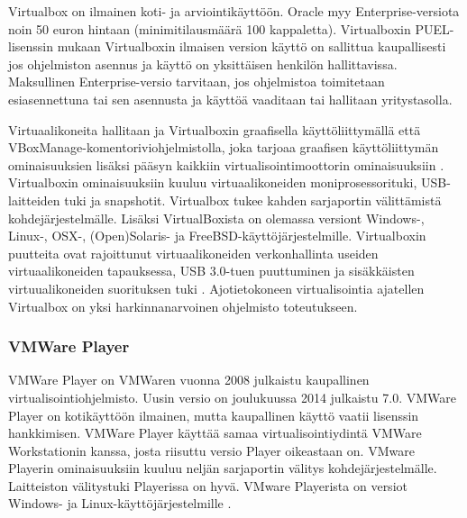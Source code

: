 
Virtualbox on ilmainen koti- ja arviointikäyttöön. Oracle myy Enterprise-versiota noin 50 euron hintaan (minimitilausmäärä 100 kappaletta).
Virtualboxin PUEL-lisenssin mukaan Virtualboxin ilmaisen version käyttö on sallittua kaupallisesti jos ohjelmiston asennus ja käyttö on yksittäisen henkilön hallittavissa. Maksullinen Enterprise-versio tarvitaan, jos ohjelmistoa toimitetaan esiasennettuna tai sen asennusta ja käyttöä vaaditaan tai hallitaan yritystasolla.\cite{virtualbox_puel,virtualbox_licensing}

Virtuaalikoneita hallitaan ja Virtualboxin graafisella käyttöliittymällä että VBoxManage-komentoriviohjelmistolla, joka tarjoaa graafisen käyttöliittymän ominaisuuksien lisäksi pääsyn kaikkiin virtualisointimoottorin ominaisuuksiin \cite{virtualbox_manual}. Virtualboxin ominaisuuksiin kuuluu virtuaalikoneiden moniprosessorituki, USB-laitteiden tuki ja snapshotit. Virtualbox tukee kahden sarjaportin välittämistä kohdejärjestelmälle. Lisäksi VirtualBoxista on olemassa versiont Windows-, Linux-, OSX-, (Open)Solaris- ja FreeBSD-käyttöjärjestelmille. Virtualboxin puutteita ovat rajoittunut virtuaalikoneiden verkonhallinta useiden virtuaalikoneiden tapauksessa, USB 3.0-tuen puuttuminen ja sisäkkäisten virtuualikoneiden suorituksen tuki \cite{vplayervsvbox}. Ajotietokoneen virtualisointia ajatellen Virtualbox on yksi harkinnanarvoinen ohjelmisto toteutukseen.


\subsubsection{VMWare Player}
VMWare Player on VMWaren vuonna 2008 julkaistu kaupallinen virtualisointiohjelmisto. Uusin versio on joulukuussa 2014 julkaistu 7.0. VMWare Player on kotikäyttöön ilmainen, mutta kaupallinen käyttö vaatii lisenssin hankkimisen. VMWare Player käyttää samaa virtualisointiydintä VMWare Workstationin kanssa, josta riisuttu versio Player oikeastaan on. VMware Playerin ominaisuuksiin kuuluu neljän sarjaportin välitys kohdejärjestelmälle. Laitteiston välitystuki Playerissa on hyvä. VMware Playerista on versiot Windows- ja Linux-käyttöjärjestelmille \cite{vmware1}.


